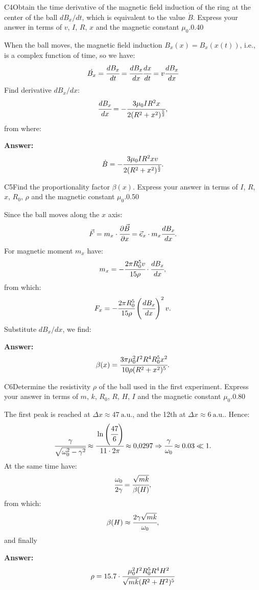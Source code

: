 \documentclass[11pt,a4paper]{article}
\begin{document}
\begin{solcard}{C4}{Obtain the time derivative of the magnetic field induction of the ring at the center of the ball $dB_x/dt$, which is equivalent to the value $\dot{B}$. Express your answer in terms of $v$, $I$, $R$, $x$ and the magnetic constant $\mu_0$.}{0.40}

When the ball moves, the magnetic field induction $B_x(x)=B_x(x(t))$, i.e., is a complex function of time, so we have: $$\dot{B_x}=\cfrac{dB_x}{dt}=\cfrac{dB_x}{dx}\cfrac{dx}{dt}=v\cfrac{dB_x}{dx} $$Find derivative $dB_x/dx$: $$\cfrac{dB_x}{dx}=-\cfrac{3\mu_0IR^2x}{2(R^2+x^2)^{\frac{5}{2}}}{,} $$from where:

\par\smallskip\noindent\textbf{Answer:} $$\dot{B}=-\cfrac{3\mu_0IR^2xv}{2(R^2+x^2)^{\frac{5}{2}}}{.} $$
\end{solcard}

\begin{solcard}{C5}{Find the proportionality factor $\beta(x)$. Express your answer in terms of $I$, $R$, $x$, $R_0$, $\rho$ and the magnetic constant $\mu_0$.}{0.50}

Since the ball moves along the $x$ axis: $$\vec{F}=m_x\cdot\cfrac{\partial\vec{B}}{\partial x}=\vec{e}_x\cdot m_x\cfrac{dB_x}{dx}{.} $$For magnetic moment $m_x$ have: $$m_x=-\cfrac{2\pi{R}^5_0v}{15\rho}\cdot\cfrac{dB_x}{dx}{,} $$from which: $$F_x=-\cfrac{2\pi{R}^5_0}{15\rho}\left(\cfrac{dB_x}{dx}\right)^2v{.} $$Substitute $dB_x/dx$, we find:

\par\smallskip\noindent\textbf{Answer:} $$\beta(x)=\cfrac{3\pi\mu^2_0I^2R^4R^5_0x^2}{10\rho(R^2+x^2)^5}{.} $$
\end{solcard}

\begin{solcard}{C6}{Determine the resistivity $\rho$ of the ball used in the first experiment. Express your answer in terms of $m$, $k$, $R_0$, $R$, $H$, $I$ and the magnetic constant $\mu_0$.}{0.80}

The first peak is reached at $\Delta{x}\approx{47~\text{a.u.}}$, and the 12th at $\Delta{x}\approx{6~\text{a.u.}}$. Hence: $$\cfrac{\gamma}{\sqrt{\omega^2_0-\gamma^2}}\approx{\cfrac{\ln\left(\cfrac{47}{6}\right)}{11\cdot{2\pi}}}\approx{0{,}0297}\Rightarrow \cfrac{\gamma}{\omega_0}\approx 0{.}03\ll{1}{.} $$At the same time have: $$\cfrac{\omega_0}{2\gamma}=\cfrac{\sqrt{mk}}{\beta(H)}{,} $$from which: $$\beta(H)\approx{\cfrac{2\gamma\sqrt{mk}}{\omega_0}}{,} $$and finally

\par\smallskip\noindent\textbf{Answer:} $$\rho=15{.}7\cdot\cfrac{\mu^2_0I^2R^5_0R^4H^2}{\sqrt{mk}(R^2+H^2)^5} $$
\end{solcard}
\end{document}
